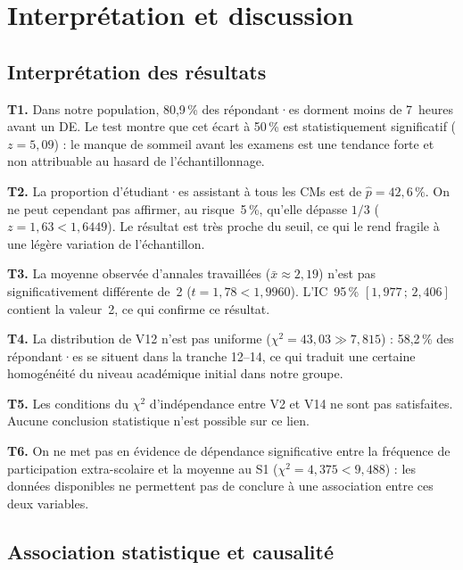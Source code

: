 
\section{Interprétation et discussion}

\subsection{Interprétation des résultats}

\textbf{T1.} Dans notre population, 80,9\,\% des répondant·es dorment moins de
7~heures avant un DE. Le test montre que cet écart à 50\,\% est statistiquement
significatif ($z = 5{,}09$) : le manque de sommeil avant les examens est une
tendance forte et non attribuable au hasard de l'échantillonnage.

\textbf{T2.} La proportion d'étudiant·es assistant à tous les CMs est de
$\hat{p} = 42{,}6\,\%$. On ne peut cependant pas affirmer, au risque~5\,\%,
qu'elle dépasse $1/3$ ($z = 1{,}63 < 1{,}6449$). Le résultat est très proche
du seuil, ce qui le rend fragile à une légère variation de l'échantillon.

\textbf{T3.} La moyenne observée d'annales travaillées ($\bar{x} \approx 2{,}19$)
n'est pas significativement différente de~2 ($t = 1{,}78 < 1{,}9960$). L'IC~95\,\%
$[1{,}977\,;\,2{,}406]$ contient la valeur~2, ce qui confirme ce résultat.

\textbf{T4.} La distribution de V12 n'est pas uniforme ($\chi^2 = 43{,}03 \gg 7{,}815$) :
58,2\,\% des répondant·es se situent dans la tranche 12--14, ce qui traduit une
certaine homogénéité du niveau académique initial dans notre groupe.

\textbf{T5.} Les conditions du $\chi^2$ d'indépendance entre V2 et V14 ne sont
pas satisfaites. Aucune conclusion statistique n'est possible sur ce lien.

\textbf{T6.} On ne met pas en évidence de dépendance significative entre la
fréquence de participation extra-scolaire et la moyenne au S1
($\chi^2 = 4{,}375 < 9{,}488$) : les données disponibles ne permettent pas de
conclure à une association entre ces deux variables.

\subsection{Association statistique et causalité}

